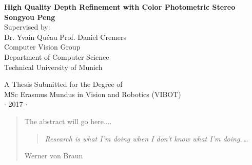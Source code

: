 
\newpage
\thispagestyle{empty}


\vspace*{0cm}
\begin{center}
{\LARGE\bf High Quality Depth Refinement with Color Photometric Stereo\\} \vspace{2cm} {\Large \textbf{Songyou Peng}}\\
\vspace{1.5cm}
{ 
Supervised by:\\ \vspace{0.4cm}
\large Dr. Yvain Qu\'eau \hspace{0.8cm} Prof. Daniel Cremers
}
\\\vspace{2.5cm}
{\large
Computer Vision Group \\
\vspace{0.4cm}
Department of Computer Science\\
\vspace{0.4cm}
Technical University of Munich}

\end{center}

\vspace{3cm}
\begin{center}
{\large A Thesis Submitted for the Degree of \\MSc Erasmus Mundus
in Vision and Robotics (VIBOT) \\\vspace{0.3cm} $\cdot$ 2017
$\cdot$}
\end{center}
\singlespacing


\begin{abstract}
The abstract will go here....

\vspace*{5cm}



\begin{center}
\begin{quote}
\it Research is what I'm doing when I don't know what I'm
doing.\,\ldots
\end{quote}
\end{center}
\hfill{\small Werner von Braun}

\end{abstract}

